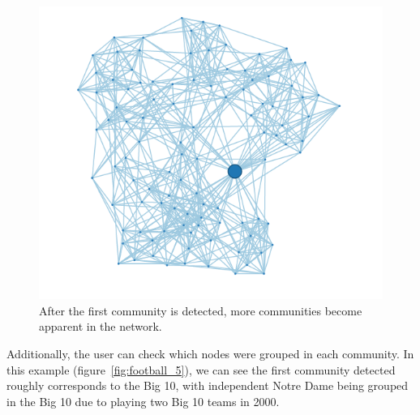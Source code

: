 \documentclass{article}\usepackage[]{graphicx}\usepackage[]{color}
\begin{document}
\begin{figure}[H]
\centering
\includegraphics[width=\textwidth]{images/football_4.png}
\caption{\label{fig:football_4} After the first community is detected, more communities become apparent in the network.}
\end{figure}

Additionally, the user can check which nodes were grouped in each community. In this example (figure~\ref{fig:football_5}), we can see the first community detected roughly corresponds to the Big 10, with independent Notre Dame being grouped in the Big 10 due to playing two Big 10 teams in 2000.
\end{document}
